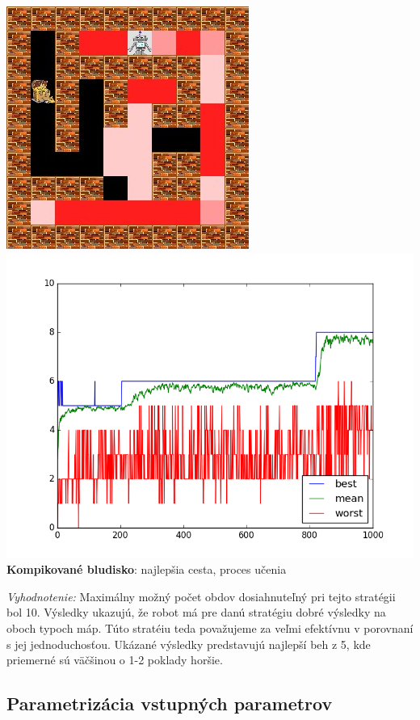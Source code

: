 \documentclass[10pt]{paper}
\begin{document}
\begin{center}
  \includegraphics[scale=0.5]{strategy2_complicated.jpg} 
  \includegraphics[scale=0.38]{strategy2_complicated_graph.png} \\
   \textbf{Kompikované bludisko}: najlepšia cesta, proces učenia
     \end{center}
     
\textit{Vyhodnotenie:} Maximálny možný počet obdov dosiahnuteľný pri tejto stratégii bol 10. Výsledky ukazujú, že robot má pre danú stratégiu dobré výsledky na oboch typoch máp. Túto stratéiu teda považujeme za veľmi efektívnu v porovnaní s jej jednoduchosťou. Ukázané výsledky predstavujú najlepší beh z 5, kde priemerné sú väčšinou o 1-2 poklady horšie.

\newpage
\subsection{Parametrizácia vstupných parametrov}
\end{document}
